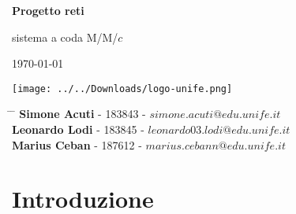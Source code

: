 \documentclass[12pt,a4paper]{article}
\begin{document}
	
	\newcommand{\subf}[2]{%
		{\small\begin{tabular}[t]{@{}c@{}}
				#1\\#2
		\end{tabular}}%
	}
	
	\begin{titlepage}
		\begin{center}
			\vspace*{3cm}
			
			\Huge
			\textbf{Progetto reti}
			
			\vspace{0.3cm}
			\Huge
			 sistema a coda M/M/$c$
			
			\vspace{0.8cm}
			\large
			\today
			
			
			\vspace{0.5cm}
			\LARGE
			
			
			\vspace{3cm}
			
			\textbf{}
     		\texttt{[image: ../../Downloads/logo-unife.png]}        
			
			\vfill
			
			
			
			\vspace{2.8cm}
			
			
			
			\Large
			
			
			
			
		\end{center}
		\Large
		\begin{tabbing}
			\hspace*{0em}\= \hspace*{0em} \= \kill %
			\>\> \textbf{Simone Acuti} - 183843 - $simone.acuti@edu.unife.it$\\
			\>\> \textbf{Leonardo Lodi} - 183845 - $leonardo03.lodi@edu.unife.it$\\
			\>\> \textbf{Marius Ceban} - 187612 - $marius.cebann@edu.unife.it$  \\
		\end{tabbing}
		
\end{titlepage}
\tableofcontents
\newpage

\section{Introduzione}
\end{document}
